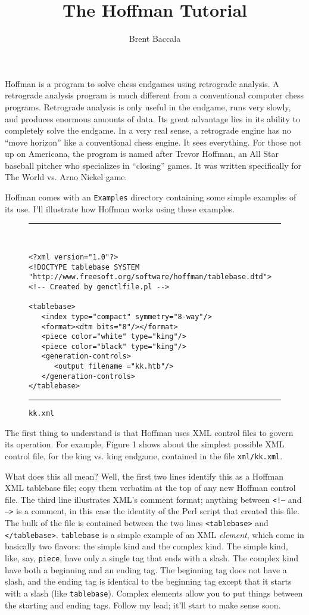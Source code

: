\documentclass[11pt]{article}
\title{The Hoffman Tutorial}
\author{Brent Baccala}
\begin{document}
\maketitle

\parindent 0pt
\parskip 12pt

Hoffman is a program to solve chess endgames using retrograde
analysis.
A retrograde analysis program is much different from a conventional
computer chess programs.  Retrograde analysis is only useful in the
endgame, runs very slowly, and produces enormous amounts of data.  Its
great advantage lies in its ability to completely solve the endgame.
In a very real sense, a retrograde engine has no ``move horizon'' like a
conventional chess engine.  It sees everything.
For those not up on Americana, the program is named after
Trevor Hoffman, an All Star baseball pitcher who specializes in
``closing'' games.  It was written specifically for The World vs. Arno
Nickel game.

Hoffman comes with an {\tt Examples} directory containing some simple
examples of its use.  I'll illustrate how Hoffman works using these
examples.

\begin{figure}
\hrule\ 
{\small\begin{verbatim}
<?xml version="1.0"?>
<!DOCTYPE tablebase SYSTEM "http://www.freesoft.org/software/hoffman/tablebase.dtd">
<!-- Created by genctlfile.pl -->

<tablebase>
   <index type="compact" symmetry="8-way"/>
   <format><dtm bits="8"/></format>
   <piece color="white" type="king"/>
   <piece color="black" type="king"/>
   <generation-controls>
      <output filename ="kk.htb"/>
   </generation-controls>
</tablebase>
\end{verbatim}}
\hrule
\caption{\tt kk.xml}
\end{figure}

The first thing to understand is that Hoffman uses XML
control files to govern its operation.
For example, Figure 1 shows about the simplest possible XML control file, for
the king vs. king endgame, contained in the file {\tt xml/kk.xml}.

What does this all mean?  Well, the first two lines identify this as a
Hoffman XML tablebase file; copy them verbatim at the top of any new
Hoffman control file.  The third line illustrates XML's comment
format; anything between {\tt <!--} and {\tt -->} is a comment, in
this case the identity of the Perl script that created this file. The
bulk of the file is contained between the two lines {\tt <tablebase>}
and {\tt </tablebase>}.  {\tt tablebase} is a simple example of an XML
{\it element}, which come in basically two flavors: the simple kind
and the complex kind.  The simple kind, like, say, {\tt piece}, have
only a single tag that ends with a slash.  The complex kind have both
a beginning and an ending tag.  The beginning tag does not have a
slash, and the ending tag is identical to the beginning tag except
that it starts with a slash (like {\tt tablebase}).  Complex elements
allow you to put things between the starting and ending tags.  Follow
my lead; it'll start to make sense soon.
\end{document}
